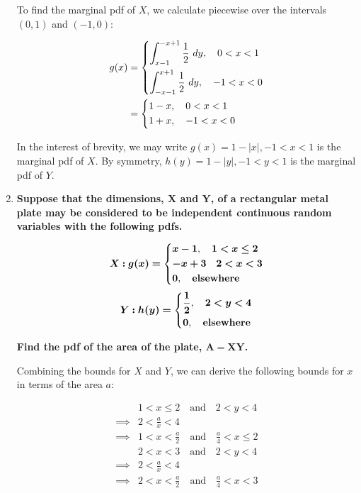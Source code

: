 \documentclass[10pt, oneside]{article}   	%
\theoremstyle{definition}
\begin{document}
\begin{enumerate}[label=6.\arabic*]
	To find the marginal pdf of $X$, we calculate piecewise over the intervals $(0, 1)$ and $(-1, 0)$:
	
	\begin{align*}
	g(x) &= \begin{dcases}
	 \int^{-x + 1}_{x - 1} \frac{1}{2} \ dy, \quad 0 < x < 1 \\
	 \int^{x+1}_{-x-1} \frac{1}{2} \ dy, \quad -1 < x < 0
	 \end{dcases} \\
	 &= \begin{dcases}
	 1 - x, \quad 0 < x < 1 \\
	 1 + x, \quad -1 < x < 0
	 \end{dcases}
	 \end{align*}

	In the interest of brevity, we may write $\boxed{g(x) = 1 - |x|, -1 < x < 1}$ is the marginal pdf of $X$. By symmetry, $\boxed{h(y) = 1 - |y|, -1 < y < 1}$ is the marginal pdf of $Y$.

\item  \begin{tcolorbox}[
  colback=Cerulean!5!white,
  colframe=Cerulean!75!black]
\textbf{Suppose that the dimensions, $\bm{X}$ and $\bm{Y}$, of a rectangular metal plate may be considered to be independent continuous random variables with the following pdfs.}

\[
\bm{X: g(x) =} \begin{dcases}
\bm{x - 1}, \quad \bm{1 < x \leq 2} \\
\bm{-x + 3} \quad \bm{2 < x < 3} \\
\bm{0}, \quad \textbf{elsewhere}
\end{dcases}
\]
\[
\bm{Y: h(y) =} \begin{dcases}
\bm{\frac{1}{2}}, \quad \bm{2 < y < 4} \\
\bm{0}, \quad \textbf{elsewhere}
\end{dcases}
\]

\textbf{Find the pdf of the area of the plate, $\bm{A = XY}$.}
\end{tcolorbox}

Combining the bounds for $X$ and $Y$, we can derive the following bounds for $x$ in terms of the area $a$:

\begin{align*}
&1 < x \leq 2 \quad \text{and} \quad 2 < y < 4 \\
\implies &2 < \frac{a}{x} < 4 \\
\implies &\boxed{1 < x < \frac{a}{2}} \quad \text{and} \quad \boxed{\frac{a}{4} < x \leq 2} \\
&2 < x < 3 \quad \text{and} \quad 2 < y < 4 \\
\implies &2 < \frac{a}{x} < 4 \\
\implies &\boxed{ 2 < x < \frac{a}{2} } \quad \text{and} \quad \boxed{ \frac{a}{4} < x < 3 }
\end{align*}


\end{enumerate}
\end{document}
